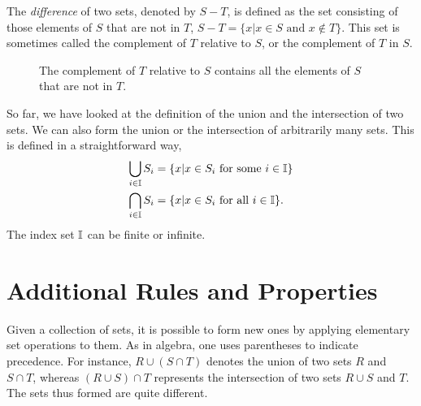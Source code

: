 The \emph{difference} of two sets, denoted by $S - T$, is defined as the set consisting of those elements of $S$ that are not in $T$, $S - T = \{ x | x \in S \text{ and } x \notin T \}$.
This set is sometimes called the complement of $T$ relative to $S$, or the complement of $T$ in $S$.

\begin{figure}[htb]
\begin{center}
\caption{The complement of $T$ relative to $S$ contains all the elements of $S$ that are not in $T$.}
\end{center}
\end{figure}

So far, we have looked at the definition of the union and the intersection of two sets.
We can also form the union or the intersection of arbitrarily many sets.
This is defined in a straightforward way,
\begin{align*}
\bigcup_{i \in \mathbb{I}} S_{i}
&= \{ x | x \in S_{i} \text{ for some } i \in \mathbb{I} \} \\
\bigcap_{i \in \mathbb{I}} S_{i}
&= \{ x | x \in S_{i} \text{ for all } i \in \mathbb{I} \} .
\end{align*}
The index set $\mathbb{I}$ can be finite or infinite.


\section{Additional Rules and Properties}

Given a collection of sets, it is possible to form new ones by applying elementary set operations to them.
As in algebra, one uses parentheses to indicate precedence.
For instance, $R \cup (S \cap T)$ denotes the union of two sets $R$ and $S \cap T$, whereas $(R \cup S) \cap T$ represents the intersection of two sets $R \cup S$ and $T$.
The sets thus formed are quite different.

